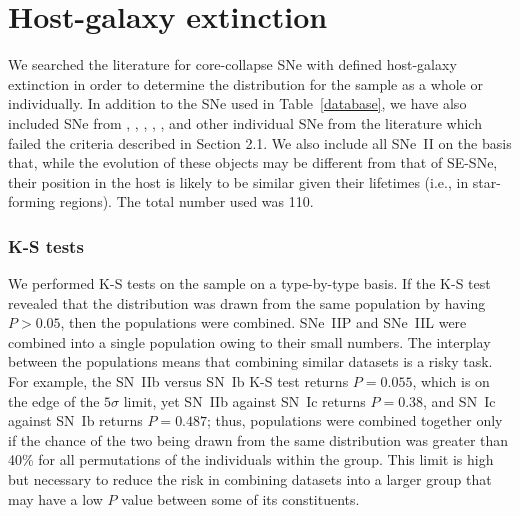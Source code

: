 \documentclass[a4paper,fleqn,usenatbib]{mnras}
\begin{document}

\appendix

\section{Host-galaxy extinction}


We searched the literature for core-collapse SNe with defined host-galaxy extinction in order to determine the distribution for the sample as a whole or individually. In addition to the SNe used in Table~\ref{database}, we have also included SNe from \cite{Cano2013}, \cite{Pritchard2014}, \cite{Cano2014A}, \cite{Richardson2009}, \cite{Richardson2006}, and other individual SNe from the literature which failed the criteria described in Section 2.1. We also include all SNe~II on the basis that, while the evolution of these objects may be different from that of SE-SNe, their position in the host is likely to be similar given their lifetimes (i.e., in star-forming regions). The total number used was 110.
\subsubsection{K-S tests}
We performed K-S tests on the sample on a type-by-type basis. If the K-S test revealed that the distribution was drawn from the same population by having $P > 0.05$, then the populations were combined. SNe~IIP and SNe~IIL were combined into a single population owing to their small numbers. The interplay between the populations means that combining similar datasets is a risky task. For example, the SN~IIb versus SN~Ib K-S test returns $P = 0.055$, which is on the edge of the $5\sigma$ limit, yet SN~IIb against SN~Ic returns $P = 0.38$, and SN~Ic against SN~Ib returns $P = 0.487$; thus, populations were combined together only if the chance of the two being drawn from the same distribution was greater than 40\% for all permutations of the individuals within the group. This limit is high but necessary to reduce the risk in combining datasets into a larger group that may have a low $P$ value between some of its constituents. 
\end{document}
